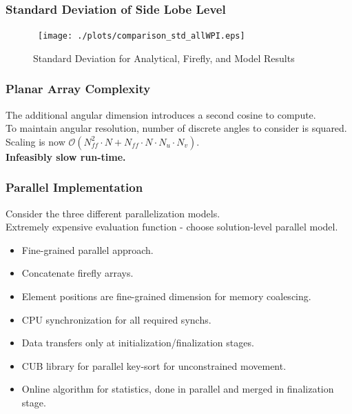 \documentclass[...]{beamer}
\begin{document}
\begin{frame}
  \frametitle{Standard Deviation of Side Lobe Level}

  \begin{figure}[H] 
    \centerline{\hbox{ \hspace{0.0in}
        \texttt{[image: ./plots/comparison\_std\_allWPI.eps]}
      }
    }
    \caption {Standard Deviation for Analytical, Firefly, and Model Results}\label{fig:comparisonstdall}
  \end{figure}

\end{frame}

\begin{frame}
  \frametitle{Planar Array Complexity}

  The additional angular dimension introduces a second cosine to compute.\\
  \vspace{3mm}
  To maintain angular resolution, number of discrete angles to consider is squared.\\
  \vspace{3mm}
  Scaling is now $\mathcal{O}\left(N_{f\!f}^2 \cdot N + N_{f\!f} \cdot N \cdot N_u \cdot N_v\right)$.\\
  \vspace{3mm}
  \textbf{Infeasibly slow run-time.}

\end{frame}

\begin{frame}
  \frametitle{Parallel Implementation}

  Consider the three different parallelization models\cite{Luong2013}.\\
  \vspace{3mm}
  Extremely expensive evaluation function - choose solution-level parallel model.\\
  \vspace{3mm}
  \begin{itemize}
  \item Fine-grained parallel approach.
  \item Concatenate firefly arrays.
  \item Element positions are fine-grained dimension for memory coalescing.
  \item CPU synchronization for all required synchs.
  \item Data transfers only at initialization/finalization stages.
  \item CUB library for parallel key-sort for unconstrained movement.
  \item Online algorithm\cite{Knuth1998} for statistics, done in parallel and merged in finalization stage.
  \end{itemize}

\end{frame}
\end{document}
